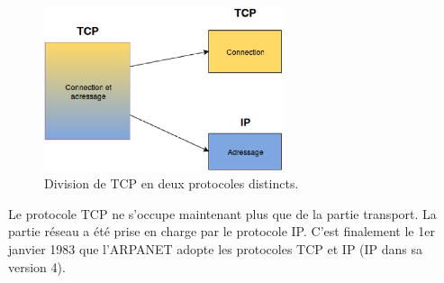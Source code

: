 \begin{figure}
\centering
\includegraphics[width=7cm]{./pics/tcp2ip.eps}
\caption{Division de TCP en deux protocoles distincts.}
\label{fig:tcp2ip}
\end{figure}

Le protocole TCP ne s'occupe maintenant plus que de la partie transport. La
partie réseau a été prise en charge par le protocole IP.  C'est finalement le
1er janvier 1983 que l'ARPANET adopte les protocoles TCP et IP (IP dans sa version 4). 

